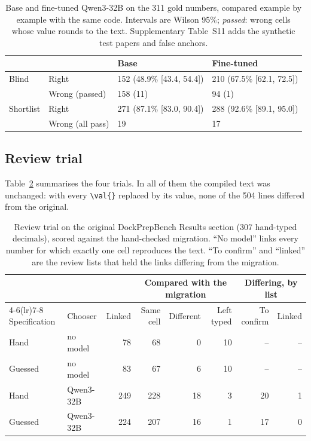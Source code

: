 \begin{table}[t]
\centering
\small
\caption{Base and fine-tuned Qwen3-32B on the 311 gold numbers, compared example by example with
the same code. Intervals are Wilson 95\%; \emph{passed}: wrong cells whose value rounds to the
text. Supplementary Table~S11 adds the synthetic test papers and false anchors.}
\label{tab:finetune}
\begin{tabular}{llll}
\toprule
& & Base & Fine-tuned \\
\midrule
Blind & Right & 152 (48.9\% [43.4, 54.4]) & 210 (67.5\% [62.1, 72.5]) \\
 & Wrong (passed) & 158 (11) & 94 (1) \\
Shortlist & Right & 271 (87.1\% [83.0, 90.4]) & 288 (92.6\% [89.1, 95.0]) \\
 & Wrong (all pass) & 19 & 17 \\
\bottomrule
\end{tabular}
\end{table}

\subsection{Review trial}
\label{sec:res-review}

Table~\ref{tab:review} summarises the four trials. In all of them the compiled text was unchanged:
with every \texttt{\textbackslash val\{\}} replaced by its value, none of the 504 lines
differed from the original.

\begin{table}[t]
\centering
\small
\caption{Review trial on the original DockPrepBench Results section (307 hand-typed decimals),
scored against the hand-checked migration. ``No model'' links every number for which exactly one
cell reproduces the text. ``To confirm'' and ``linked'' are the review lists that held the links
differing from the migration.}
\label{tab:review}
\begin{tabular}{llrrrrrr}
\toprule
& & & \multicolumn{3}{c}{Compared with the migration} & \multicolumn{2}{c}{Differing, by list} \\
\cmidrule(lr){4-6}\cmidrule(lr){7-8}
Specification & Chooser & Linked & Same cell & Different & Left typed & To confirm & Linked \\
\midrule
Hand    & no model   & 78  & 68  & 0  & 10 & -- & -- \\
Guessed & no model   & 83  & 67  & 6  & 10 & -- & -- \\
Hand    & Qwen3-32B  & 249 & 228 & 18 & 3  & 20 & 1 \\
Guessed & Qwen3-32B  & 224 & 207 & 16 & 1  & 17 & 0 \\
\bottomrule
\end{tabular}
\end{table}


